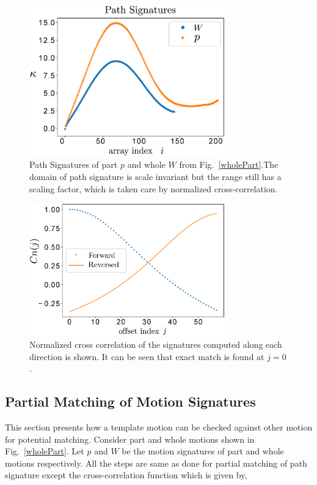 \documentclass[twocolumn,10pt]{asme2e}
\begin{document}
\begin{figure}
\centering
\includegraphics[width=240pt]{figure/fig_path_signatures.eps}
  \caption{Path Signatures of part $p$ and whole $W$ from Fig.~\ref{wholePart}.The domain of path signature is scale invariant but the range still has a scaling factor, which is taken care by normalized cross-correlation.}
\label{pathSignature}
\end{figure}

\begin{figure}
\centering
\includegraphics[width=240pt]{figure/fig_ncc.eps}
  \caption{Normalized cross correlation of the signatures computed along each direction is shown. It can be seen that exact match is found at $j=0$.}
\label{ncc}
\end{figure}

\subsection{Partial Matching of Motion Signatures}\label{sec_mcc}
This section presents how a template motion can be checked against other motion for potential matching.
Consider part and whole motions shown in Fig.~\ref{wholePart}.
Let $p$ and $W$ be the motion signatures of part and whole motions respectively.
All the steps are same as done for partial matching of path signature except the cross-correlation function which is given by,
\end{document}

